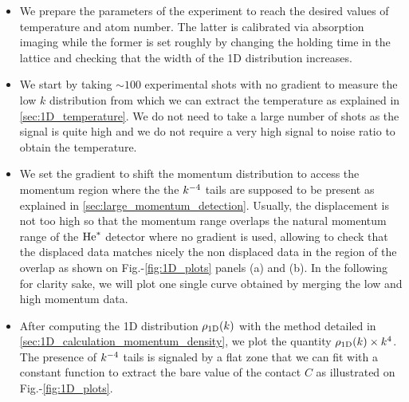 \begin{itemize}
    \item We prepare the parameters of the experiment to reach the desired values of temperature and atom number. The latter is calibrated via absorption imaging while the former is set roughly by changing the holding time in the lattice and checking that the width of the 1D distribution increases. 
    \item We start by taking $\sim 100$ experimental shots with no gradient to measure the low $k$ distribution from which we can extract the temperature as explained in \ref{sec:1D_temperature}. We do not need to take a large number of shots as the signal is quite high and we do not require a very high signal to noise ratio to obtain the temperature.
    \item We set the gradient to shift the momentum distribution to access the momentum region where the the $k^{-4}$ tails are supposed to be present as explained in \ref{sec:large_momentum_detection}. Usually, the displacement is not too high so that the momentum range overlaps the natural momentum range of the $\mathrm{He}^*$ detector where no gradient is used, allowing to check that the displaced data matches nicely the non displaced data in the region of the overlap as shown on Fig.-\ref{fig:1D_plots} panels (a) and (b). In the following for clarity sake, we will plot one single curve obtained by merging the low and high momentum data.
    \item After computing the 1D distribution $\rho_{\rm{1D}} (k)$ with the method detailed in \ref{sec:1D_calculation_momentum_density}, we plot the quantity $\rho_{\rm{1D}} (k) \times k^4$. The presence of $k^{-4}$ tails is signaled by a flat zone that we can fit with a constant function to extract the bare value of the contact $C$ as illustrated on Fig.-\ref{fig:1D_plots}.

    
\end{itemize}  
    
